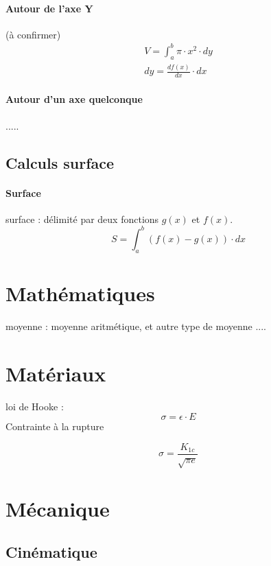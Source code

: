 \paragraph{Autour de l'axe Y}
(à confirmer)
\begin{eqnarray}
V=\int_{a}^{b}\pi \cdot x^2 \cdot dy\\
dy=\frac{df(x)}{dx}\cdot dx
\end{eqnarray}
\paragraph{Autour d'un axe quelconque}
.....
\subsection{Calculs surface}
\paragraph{Surface}
surface : délimité par deux fonctions $g(x)$ et $f(x)$. 
\begin{equation}
S=\int_{a}^{b} (f(x)-g(x)) \cdot dx
\end{equation}
\newpage
\section{Mathématiques}
moyenne : moyenne aritmétique, et autre type de moyenne ....

\newpage
\section{Matériaux}
loi de Hooke :
\begin{equation}
\sigma = \epsilon \cdot E 
\end{equation}
Contrainte à la rupture 

\begin{equation}
\sigma=\frac{K_{1c}}{\sqrt{\pi e}}
\end{equation}


\newpage
\section{Mécanique}


\subsection{Cinématique}


